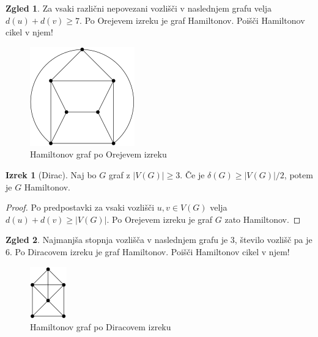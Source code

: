 \documentclass[11pt]{book}
\theoremstyle{definition}
\theoremstyle{zgled}
\newtheorem*{zgled}{Zgled}
\theoremstyle{odprtproblem}
\theoremstyle{domacanaloga}
\newenvironment{dokaz}
    {\color{siva}\begin{proof}}
    {\end{proof}}
\theoremstyle{izrek}
\newtheorem*{izrek}{Izrek}
\begin{document}
\begin{zgled}
    Za vsaki različni nepovezani vozlišči v naslednjem grafu velja $d(u) + d(v) \geq 7$. Po Orejevem izreku je graf Hamiltonov. Poišči Hamiltonov cikel v njem!

    \begin{figure}[h]
        \centering
        \includegraphics[width=0.5\linewidth]{img/grafi-hamilton-ore.png}
        \caption{Hamiltonov graf po Orejevem izreku}
    \end{figure}  
\end{zgled}

\begin{izrek}[Dirac]
    Naj bo $G$ graf z $|V(G)| \geq 3$. Če je $\delta(G) \geq |V(G)|/2$, potem je $G$ Hamiltonov.
\end{izrek}
\begin{dokaz}
    Po predpostavki za vsaki vozlišči $u,v \in V(G)$ velja $d(u) + d(v) \geq |V(G)|$. Po Orejevem izreku je graf $G$ zato Hamiltonov.
\end{dokaz}

\begin{zgled}
    Najmanjša stopnja vozlišča v naslednjem grafu je $3$, število vozlišč pa je $6$. Po Diracovem izreku je graf Hamiltonov. Poišči Hamiltonov cikel v njem!

    \begin{figure}[h]
        \centering
        \includegraphics[width=0.25\linewidth]{img/grafi-hamilton-dirac.png}
        \caption{Hamiltonov graf po Diracovem izreku}
    \end{figure}  
\end{zgled}
\end{document}
